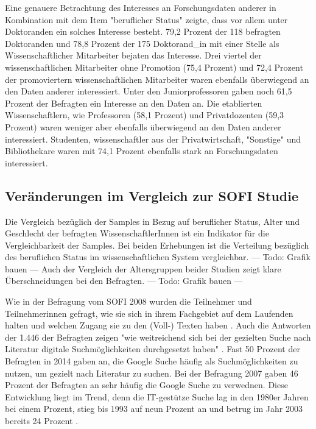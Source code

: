 Eine genauere Betrachtung des Interesses an Forschungsdaten anderer in Kombination mit dem Item "beruflicher Status" zeigte, dass vor allem unter Doktoranden ein solches Interesse besteht. 79,2 Prozent der 118 befragten Doktoranden und 78,8 Prozent der 175 Doktorand_in mit einer Stelle als Wissenschaftlicher Mitarbeiter bejaten das Interesse. Drei viertel der wissenschaftlichen Mitarbeiter ohne Promotion (75,4 Prozent) und 72,4 Prozent der promoviertern wissenschaftlichen Mitarbeiter waren ebenfalls überwiegend an den Daten anderer interessiert. Unter den Juniorprofessoren gaben noch 61,5 Prozent der Befragten ein Interesse an den Daten an. Die etablierten Wissenschaftlern, wie Professoren (58,1 Prozent) und Privatdozenten (59,3 Prozent) waren weniger aber ebenfalls überwiegend an den Daten anderer interessiert.  Studenten, wissenschaftler aus der Privatwirtschaft, "Sonstige" und Bibliothekare waren mit 74,1 Prozent ebenfalls stark an Forschungsdaten interessiert.


\subsection{Veränderungen im Vergleich zur SOFI Studie}

Die Vergleich bezüglich der Samples in Bezug auf beruflicher Status, Alter und Geschlecht der befragten WissenschaftlerInnen ist ein Indikator für die Vergleichbarkeit der Samples. Bei beiden Erhebungen ist die Verteilung bezüglich des beruflichen Status im wissenschaftlichen System vergleichbar.
--- Todo: Grafik bauen ---
Auch der Vergleich der Altersgruppen beider Studien zeigt klare Überschneidungen bei den Befragten.  --- Todo: Grafik bauen ---

Wie in der Befragung vom SOFI 2008 wurden die Teilnehmer und Teilnehmerinnen gefragt, wie sie sich in ihrem Fachgebiet auf dem Laufenden halten und welchen Zugang sie zu den (Voll-) Texten haben \cite{hanekop_2008}. Auch die Antworten der 1.446 der Befragten zeigen "wie weitreichend sich bei der gezielten Suche nach Literatur digitale Suchmöglichkeiten durchgesetzt haben" \cite{hanekop_2008}. Fast 50 Prozent der Befragten in 2014 gaben an, die Google Suche häufig als Suchmöglichkeiten zu nutzen, um gezielt nach Literatur zu suchen. Bei der Befragung 2007 gaben 46 Prozent der Befragten an sehr häufig die Google Suche zu verwednen. Diese Entwicklung liegt im Trend, denn die IT-gestütze Suche lag in den 1980er Jahren bei einem Prozent, stieg bis 1993 auf neun Prozent an und betrug im Jahr 2003 bereits 24 Prozent \cite{hanekop_2008}.

